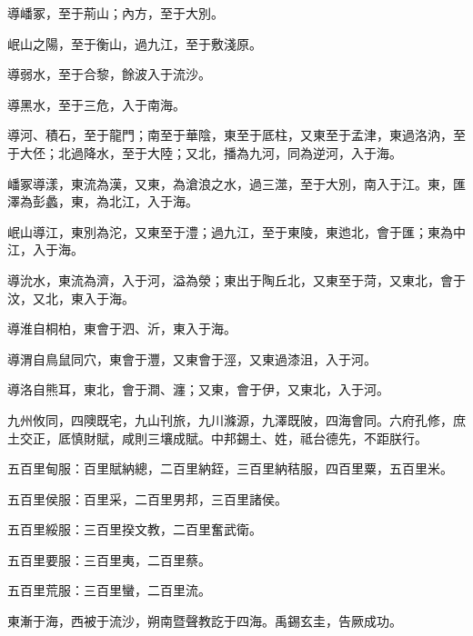 \begin{pinyinscope}
導嶓冢，至于荊山；內方，至于大別。

岷山之陽，至于衡山，過九江，至于敷淺原。

導弱水，至于合黎，餘波入于流沙。

導黑水，至于三危，入于南海。

導河、積石，至于龍門；南至于華陰，東至于厎柱，又東至于孟津，東過洛汭，至于大伾；北過降水，至于大陸；又北，播為九河，同為逆河，入于海。

嶓冢導漾，東流為漢，又東，為滄浪之水，過三澨，至于大別，南入于江。東，匯澤為彭蠡，東，為北江，入于海。

岷山導江，東別為沱，又東至于澧；過九江，至于東陵，東迆北，會于匯；東為中江，入于海。

導沇水，東流為濟，入于河，溢為滎；東出于陶丘北，又東至于菏，又東北，會于汶，又北，東入于海。

導淮自桐柏，東會于泗、沂，東入于海。

導渭自鳥鼠同穴，東會于灃，又東會于涇，又東過漆沮，入于河。

導洛自熊耳，東北，會于澗、瀍；又東，會于伊，又東北，入于河。

九州攸同，四隩既宅，九山刊旅，九川滌源，九澤既陂，四海會同。六府孔修，庶土交正，厎慎財賦，咸則三壤成賦。中邦錫土、姓，祗台德先，不距朕行。

五百里甸服：百里賦納總，二百里納銍，三百里納秸服，四百里粟，五百里米。

五百里侯服：百里采，二百里男邦，三百里諸侯。

五百里綏服：三百里揆文教，二百里奮武衛。

五百里要服：三百里夷，二百里蔡。

五百里荒服：三百里蠻，二百里流。

東漸于海，西被于流沙，朔南暨聲教訖于四海。禹錫玄圭，告厥成功。


\end{pinyinscope}